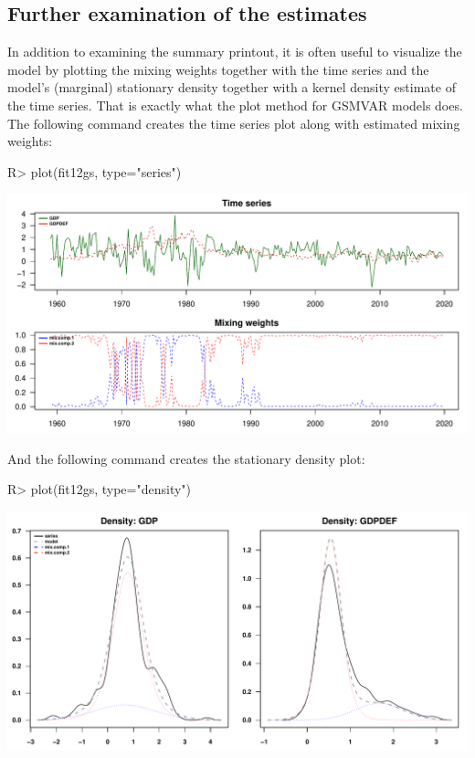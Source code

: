 \documentclass[nojss]{jss} %
\begin{document}
\subsection{Further examination of the estimates}\label{sec:examestim}
In addition to examining the summary printout, it is often useful to visualize the model by plotting the mixing weights together with the time series and the model's (marginal) stationary density together with a kernel density estimate of the time series. That is exactly what the plot method for GSMVAR models does. The following command creates the time series plot along with estimated mixing weights:
%
\begin{Schunk}
\begin{Sinput}
R> plot(fit12gs, type="series")
\end{Sinput}
\end{Schunk}
\includegraphics{gmvarkit-vignette-plotseries}
%

And the following command creates the stationary density plot:
%
\begin{Schunk}
\begin{Sinput}
R> plot(fit12gs, type="density")
\end{Sinput}
\end{Schunk}
\includegraphics{gmvarkit-vignette-plotdensity}
%
\end{document}
